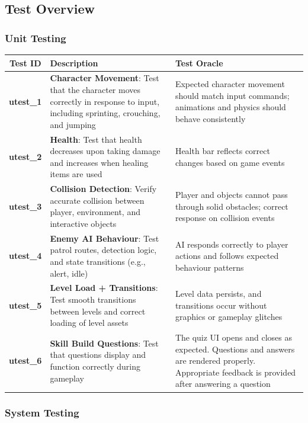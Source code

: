 \documentclass[11pt, a4paper]{article}
\begin{document}
\subsection{Test Overview}

\subsubsection{Unit Testing}

\begin{tabularx}{\linewidth}{|c|X|X|}
    \hline
    \textbf{Test ID} & \textbf{Description} & \textbf{Test Oracle} \\
    \hline
    \textbf{utest\_1} & \textbf{Character Movement}: Test that the character moves correctly in response to input, including sprinting, crouching, and jumping & Expected character movement should match input commands; animations and physics should behave consistently \\
    \hline
    \textbf{utest\_2} & \textbf{Health}: Test that health decreases upon taking damage and increases when healing items are used & Health bar reflects correct changes based on game events \\
    \hline
    \textbf{utest\_3} & \textbf{Collision Detection}: Verify accurate collision between player, environment, and interactive objects & Player and objects cannot pass through solid obstacles; correct response on collision events \\
    \hline
    \textbf{utest\_4} & \textbf{Enemy AI Behaviour}: Test patrol routes, detection logic, and state transitions (e.g., alert, idle) & AI responds correctly to player actions and follows expected behaviour patterns \\
    \hline
    \textbf{utest\_5} & \textbf{Level Load + Transitions\textbf{}}: Test smooth transitions between levels and correct loading of level assets & Level data persists, and transitions occur without graphics or gameplay glitches \\
    \hline
    \textbf{utest\_6} & \textbf{Skill Build Questions}: Test that questions display and function correctly during gameplay & The quiz UI opens and closes as expected. Questions and answers are rendered properly. Appropriate feedback is provided after answering a question \\
    \hline
\end{tabularx}

\subsubsection{System Testing}
\end{document}
